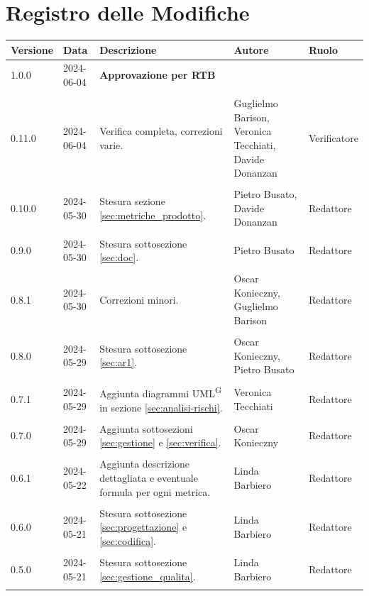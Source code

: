 \documentclass[8pt]{article}
\newcommand{\glossterm}[1]{#1\textsuperscript{G}} %
\begin{document}
\section*{Registro delle Modifiche}
\begin{table}[ht!]
\hypersetup{hidelinks}
	\centering
	\begin{tabular}{p{1.2cm} p{2cm} p{6cm} p{3cm} p{2cm}}
		\toprule
		\textbf{Versione}& \textbf{Data} & \textbf{Descrizione} & \textbf{Autore} & \textbf{Ruolo} \\
		\midrule
      1.0.0 & 2024-06-04 & \textbf{Approvazione per RTB} & & \\\\
      0.11.0 &  2024-06-04 & Verifica completa, correzioni varie. & Guglielmo Barison, Veronica Tecchiati, Davide
      Donanzan & Verificatore \\\\  
      0.10.0 & 2024-05-30 & Stesura sezione \ref{sec:metriche_prodotto}. & Pietro Busato, Davide Donanzan & Redattore \\\\
      0.9.0 & 2024-05-30 & Stesura sottosezione \ref{sec:doc}. & Pietro Busato & Redattore \\\\
		0.8.1 & 2024-05-30 & Correzioni minori. & Oscar Konieczny, Guglielmo Barison & Redattore \\\\
		0.8.0 & 2024-05-29 & Stesura sottosezione \ref{sec:ar1}. & Oscar Konieczny, Pietro Busato & Redattore \\\\ 
        0.7.1 & 2024-05-29 & Aggiunta diagrammi \glossterm{UML} in sezione \ref{sec:analisi-rischi}. & Veronica Tecchiati & Redattore \\\\
      0.7.0 & 2024-05-29 & Aggiunta sottosezioni \ref{sec:gestione} e \ref{sec:verifica}. & Oscar Konieczny & Redattore \\\\
		0.6.1 & 2024-05-22 & Aggiunta descrizione dettagliata e eventuale formula per ogni metrica. & Linda Barbiero & Redattore \\\\ %
      0.6.0 & 2024-05-21 & Stesura sottosezione \ref{sec:progettazione} e \ref{sec:codifica}. & Linda Barbiero & Redattore \\\\ %
      0.5.0 & 2024-05-21 & Stesura sottosezione \ref{sec:gestione_qualita}. & Linda Barbiero & Redattore \\\\ %

\end{tabular}
\end{table}
\end{document}

